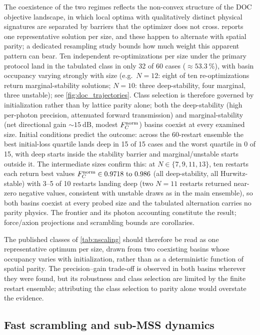 \documentclass[aps,prxquantum,preprint,superscriptaddress,amsmath,amssymb]{revtex4-2}
\newcommand{\Fnorm}{F_C^{\rm norm}}
\begin{document}
The coexistence of the two regimes reflects the non-convex structure of the DOC objective landscape, in which local optima with qualitatively distinct physical signatures are separated by barriers that the optimizer does not cross.  reports one representative solution per size, and these happen to alternate with spatial parity; a dedicated resampling study bounds how much weight this apparent pattern can bear. Ten independent re-optimizations per size under the primary protocol land in the tabulated class in only 32 of 60 cases ($\approx\qty{53.3}{\percent}$), with basin occupancy varying strongly with size (e.g.\ $N=\num{12}$: eight of ten re-optimizations return marginal-stability solutions; $N=\num{10}$: three deep-stability, four marginal, three unstable); see \cref{fig:doc_trajectories}. Class selection is therefore governed by initialization rather than by lattice parity alone; both the deep-stability (high per-photon precision, attenuated forward transmission) and marginal-stability (net directional gain $\sim\qty{15}{\dB}$, modest $\Fnorm$) basins coexist at every examined size. Initial conditions predict the outcome: across the 60-restart ensemble the best initial-loss quartile lands deep in 15 of 15 cases and the worst quartile in 0 of 15, with deep starts inside the stability barrier and marginal/unstable starts outside it. The intermediate sizes confirm this: at $N\in\{\num{7},\num{9},\num{11},\num{13}\}$, ten restarts each return best values $\Fnorm\in\numrange{0.9718}{0.986}$ (all deep-stability, all Hurwitz-stable) with 3--5 of 10 restarts landing deep (two $N=\num{11}$ restarts returned near-zero negative values, consistent with unstable draws as in the main ensemble), so both basins coexist at every probed size and the tabulated alternation carries no parity physics. The frontier and its photon accounting constitute the result; force/axion projections and scrambling bounds are corollaries.

The published classes of \cref{tab:nscaling} should therefore be read as one representative optimum per size, drawn from two coexisting basins whose occupancy varies with initialization, rather than as a deterministic function of spatial parity. The precision--gain trade-off is observed in both basins wherever they were found, but its robustness and class selection are limited by the finite restart ensemble; attributing the class selection to parity alone would overstate the evidence.

\subsection{Fast scrambling and sub-MSS dynamics}
\label{sec:scrambling}
\end{document}
